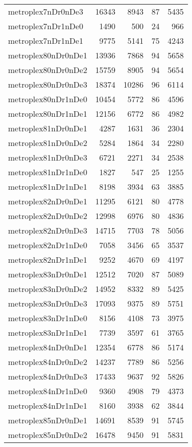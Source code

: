 \documentclass[../../../thesis.tex]{subfiles}
\begin{document}
\begin{longtable}{lrrrr}
metroplex7nDr0nDe3 & 16343 & 8943 & 87 & 5435 \\
metroplex7nDr1nDe0 & 1490 & 500 & 24 & 966 \\
metroplex7nDr1nDe1 & 9775 & 5141 & 75 & 4243 \\
metroplex80nDr0nDe1 & 13936 & 7868 & 94 & 5658 \\
metroplex80nDr0nDe2 & 15759 & 8905 & 94 & 5654 \\
metroplex80nDr0nDe3 & 18374 & 10286 & 96 & 6114 \\
metroplex80nDr1nDe0 & 10454 & 5772 & 86 & 4596 \\
metroplex80nDr1nDe1 & 12156 & 6772 & 86 & 4982 \\
metroplex81nDr0nDe1 & 4287 & 1631 & 36 & 2304 \\
metroplex81nDr0nDe2 & 5284 & 1864 & 34 & 2280 \\
metroplex81nDr0nDe3 & 6721 & 2271 & 34 & 2538 \\
metroplex81nDr1nDe0 & 1827 & 547 & 25 & 1255 \\
metroplex81nDr1nDe1 & 8198 & 3934 & 63 & 3885 \\
metroplex82nDr0nDe1 & 11295 & 6121 & 80 & 4778 \\
metroplex82nDr0nDe2 & 12998 & 6976 & 80 & 4836 \\
metroplex82nDr0nDe3 & 14715 & 7703 & 78 & 5056 \\
metroplex82nDr1nDe0 & 7058 & 3456 & 65 & 3537 \\
metroplex82nDr1nDe1 & 9252 & 4670 & 69 & 4197 \\
metroplex83nDr0nDe1 & 12512 & 7020 & 87 & 5089 \\
metroplex83nDr0nDe2 & 14952 & 8332 & 89 & 5425 \\
metroplex83nDr0nDe3 & 17093 & 9375 & 89 & 5751 \\
metroplex83nDr1nDe0 & 8156 & 4108 & 73 & 3975 \\
metroplex83nDr1nDe1 & 7739 & 3597 & 61 & 3765 \\
metroplex84nDr0nDe1 & 12354 & 6778 & 86 & 5174 \\
metroplex84nDr0nDe2 & 14237 & 7789 & 86 & 5256 \\
metroplex84nDr0nDe3 & 17433 & 9637 & 92 & 5826 \\
metroplex84nDr1nDe0 & 9360 & 4908 & 79 & 4373 \\
metroplex84nDr1nDe1 & 8160 & 3938 & 62 & 3844 \\
metroplex85nDr0nDe1 & 14691 & 8539 & 91 & 5745 \\
metroplex85nDr0nDe2 & 16478 & 9450 & 91 & 5831 \\

\end{longtable}
\end{document}
